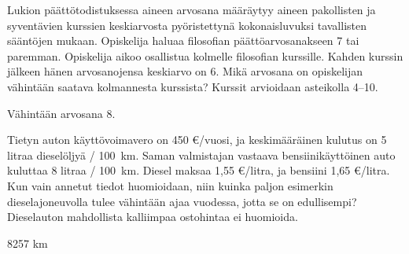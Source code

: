 \begin{tehtava}
Lukion päättötodistuksessa aineen arvosana määräytyy aineen pakollisten ja syventävien kurssien keskiarvosta pyöristettynä kokonaisluvuksi tavallisten 
sääntöjen mukaan. Opiskelija haluaa filosofian päättöarvosanakseen 7 tai paremman. Opiskelija aikoo osallistua kolmelle filosofian kurssille. Kahden 
kurssin jälkeen hänen arvosanojensa keskiarvo on 6. Mikä arvosana on opiskelijan vähintään saatava kolmannesta kurssista? Kurssit arvioidaan asteikolla 
4--10.
\begin{vastaus}
Vähintään arvosana 8.
\end{vastaus}
\end{tehtava}

\begin{tehtava}
	Tietyn auton käyttövoimavero on 450 \euro /vuosi, ja keskimääräinen kulutus on 5 litraa dieselöljyä / 100~km. Saman valmistajan vastaava bensiinikäyttöinen auto kuluttaa 8 litraa / 100~km. Diesel maksaa 1,55 \euro /litra, ja bensiini 1,65 \euro /litra. Kun vain annetut tiedot huomioidaan, niin kuinka paljon esimerkin dieselajoneuvolla tulee vähintään ajaa vuodessa, jotta se on edullisempi? Dieselauton mahdollista kalliimpaa ostohintaa ei huomioida.
    \begin{vastaus}
        8257 km
    \end{vastaus}
\end{tehtava}

